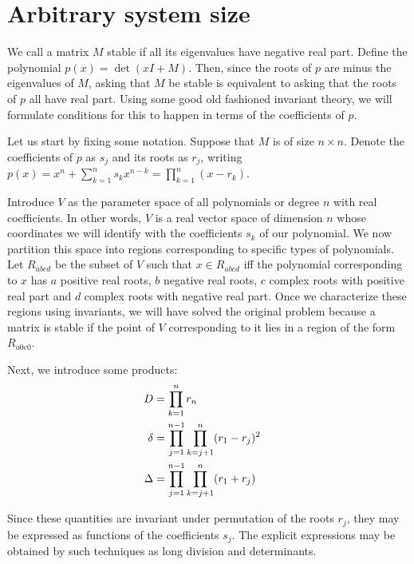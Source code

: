 \documentclass{amsart}
\theoremstyle{definition}
\theoremstyle{remark}
\numberwithin{equation}{section}
\begin{document}
\section{Arbitrary system size}
We call a matrix $M$ stable if all its eigenvalues have negative real
part.  Define the polynomial $p(x) = \det(xI + M)$.  Then, since the
roots of $p$ are minus the eigenvalues of $M$, asking that $M$ be
stable is equivalent to asking that the roots of $p$ all have real
part.  Using some good old fashioned invariant theory, we will
formulate conditions for this to happen in terms of the coefficients of
$p$.

Let us start by fixing some notation.  Suppose that $M$ is of size $n
\times n$.  Denote the coefficients of $p$ as $s_j$ and its roots as
$r_j$, writing $p(x) = x^n + \sum_{k=1}^n s_k x^{n-k} = \prod_{k=1}^n
(x-r_k)$. 

Introduce $V$ as the parameter space of all polynomials or degree $n$
with real coefficients.  In other words, $V$ is a real vector space of
dimension $n$ whose coordinates we will identify with the coefficients
$s_k$ of our polynomial.  We now partition this space into regions
corresponding to specific types of polynomials.  Let $R_{abcd}$ be the
subset of $V$ such that $x \in R_{abcd}$ iff the polynomial
corresponding to $x$ has $a$ positive real roots, $b$ negative real
roots, $c$ complex roots with positive real part and $d$ complex roots
with negative real part.  Once we characterize these regions using
invariants, we will have solved the original problem because a matrix
is stable if the point of $V$ corresponding to it lies in a region of
the form $R_{a0c0}$.

Next, we introduce some products:
\begin{align}
D &= \prod_{k=1}^n r_n \cr
\delta &= \prod_{j=1}^{n-1} \prod_{k=j+1}^n (r_1 - r_j)^2 \cr
\Delta &= \prod_{j=1}^{n-1} \prod_{k=j+1}^n (r_1 + r_j) \cr
\end{align}

Since these quantities are invariant under permutation of the roots
$r_j$, they may be expressed as functions of the coefficients $s_j$.
The explicit expressions may be obtained by such techniques as long
division and determinants.  
\end{document}
